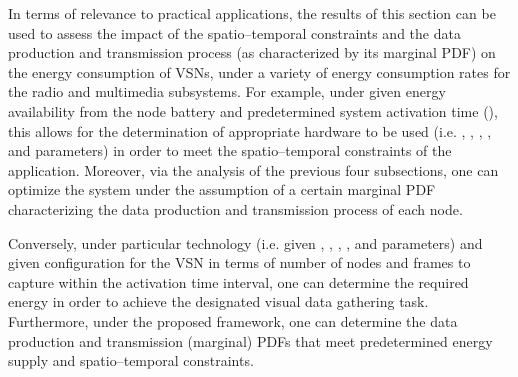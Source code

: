 \documentclass[twocolumn,english]{IEEEtran}
\theoremstyle{plain}
\theoremstyle{definition}
\begin{document}
In terms of relevance to practical applications, the results of this
section can be used to assess the impact of the spatio--temporal constraints
and the data production and transmission process (as characterized
by its marginal PDF) on the energy consumption of VSNs, under a variety
of energy consumption rates for the radio and multimedia subsystems.
For example, under given energy availability from the node battery
and predetermined system activation time (), this allows for the
determination of appropriate hardware to be used (i.e. , ,
, ,  and  parameters) in order to meet the spatio--temporal
constraints of the application. Moreover, via the analysis of the
previous four subsections, one can optimize the system under the assumption
of a certain marginal PDF characterizing the data production and transmission
process of each node.

Conversely, under particular technology (i.e. given , , ,
,  and  parameters) and given configuration for the VSN
in terms of number of nodes and frames to capture within the activation
time interval, one can determine the required energy in order to achieve
the designated visual data gathering task. Furthermore, under the
proposed framework, one can determine the data production and transmission
(marginal) PDFs that meet predetermined energy supply and spatio--temporal
constraints. 
\end{document}
